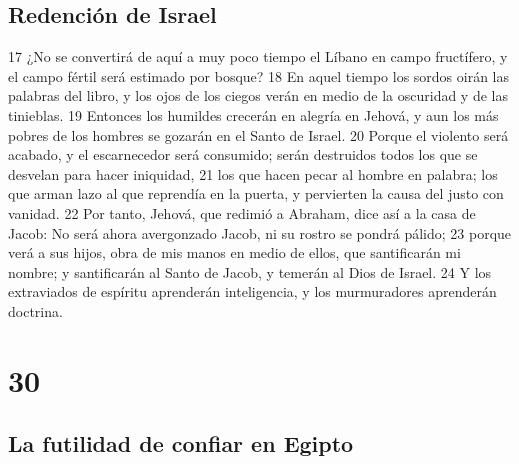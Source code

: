 \section*{Redención de Israel}

17 ¿No se convertirá de aquí a muy poco tiempo el Líbano en campo fructífero, y el campo fértil será estimado por bosque?
18 En aquel tiempo los sordos oirán las palabras del libro, y los ojos de los ciegos verán en medio de la oscuridad y de las tinieblas.
19 Entonces los humildes crecerán en alegría en Jehová, y aun los más pobres de los hombres se gozarán en el Santo de Israel.
20 Porque el violento será acabado, y el escarnecedor será consumido; serán destruidos todos los que se desvelan para hacer iniquidad,
21 los que hacen pecar al hombre en palabra; los que arman lazo al que reprendía en la puerta, y pervierten la causa del justo con vanidad.
22 Por tanto, Jehová, que redimió a Abraham, dice así a la casa de Jacob: No será ahora avergonzado Jacob, ni su rostro se pondrá pálido;
23 porque verá a sus hijos, obra de mis manos en medio de ellos, que santificarán mi nombre; y santificarán al Santo de Jacob, y temerán al Dios de Israel.
24 Y los extraviados de espíritu aprenderán inteligencia, y los murmuradores aprenderán doctrina.

\chapter{30}

\section*{La futilidad de confiar en Egipto}

